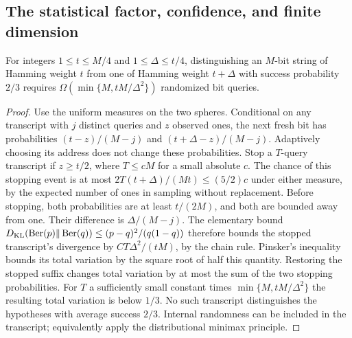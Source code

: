 \subsection{The statistical factor, confidence, and finite dimension}
\begin{lemma}\label{lem:weight}
For integers $1\leq t\leq M/4$ and $1\leq\Delta\leq t/4$,
distinguishing an $M$-bit string of Hamming weight $t$ from one of
Hamming weight $t+\Delta$ with success probability
$2/3$ requires $\Omega(\min\{M,tM/\Delta^2\})$ randomized bit queries.
\end{lemma}
\begin{proof}
Use the uniform measures on the two spheres. Conditional on any
transcript with $j$ distinct queries and $z$ observed ones, the next
fresh bit has probabilities $(t-z)/(M-j)$ and
$(t+\Delta-z)/(M-j)$. Adaptively choosing its address does not change
these probabilities. Stop a $T$-query transcript if $z\geq t/2$,
where $T\leq cM$ for a small absolute $c$. The chance of this stopping
event is at most $2T(t+\Delta)/(Mt)\leq(5/2)c$ under either measure,
by the expected number of ones in sampling without replacement.
Before stopping, both probabilities are at least $t/(2M)$, and
both are bounded away from one. Their difference is
$\Delta/(M-j)$. The elementary bound
$D_{\rm KL}(\operatorname{Ber}(p)\Vert\operatorname{Ber}(q))
\leq(p-q)^2/(q(1-q))$ therefore bounds the stopped transcript's
divergence by $CT\Delta^2/(tM)$, by the chain rule.
Pinsker's inequality bounds its total variation by the square root
of half this quantity. Restoring the stopped suffix changes total
variation by at most the sum of the two stopping probabilities.
For $T$ a sufficiently small constant times
$\min\{M,tM/\Delta^2\}$ the resulting total variation is below $1/3$.
No such transcript distinguishes the hypotheses with average success
$2/3$. Internal randomness can be included in the transcript; equivalently
apply the distributional minimax principle.
\end{proof}

